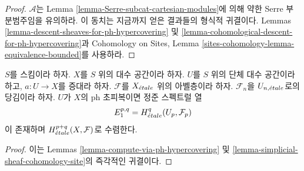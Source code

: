 \begin{proof}
$\mathcal{A}$는 Lemma
\ref{lemma-Serre-subcat-cartesian-modules}에 의해
약한 Serre 부분범주임을 유의하라. 이 동치는 지금까지 얻은 결과들의
형식적 귀결이다. Lemmas
\ref{lemma-descent-sheaves-for-ph-hypercovering} 및
\ref{lemma-cohomological-descent-for-ph-hypercovering}과
Cohomology on Sites, Lemma
\ref{sites-cohomology-lemma-equivalence-bounded}를 사용하라.
\end{proof}

\begin{lemma}
\label{lemma-spectral-sequence-ph-hypercovering}
$S$를 스킴이라 하자. $X$를 $S$ 위의 대수 공간이라 하자.
$U$를 $S$ 위의 단체 대수 공간이라 하고, $a : U \to X$를
증대라 하자. $\mathcal{F}$를 $X_{\acute{e}tale}$ 위의 아벨층이라 하자.
$\mathcal{F}_n$을 $U_{n, {\acute{e}tale}}$로의 당김이라 하자.
$U$가 $X$의 ph 초피복이면 정준 스펙트럴 열
$$
E_1^{p, q} = H^q_{\acute{e}tale}(U_p, \mathcal{F}_p)
$$
이 존재하며 $H^{p + q}_{\acute{e}tale}(X, \mathcal{F})$로 수렴한다.
\end{lemma}

\begin{proof}
이는 Lemmas \ref{lemma-compute-via-ph-hypercovering} 및
\ref{lemma-simplicial-sheaf-cohomology-site}의 즉각적인 귀결이다.
\end{proof}







